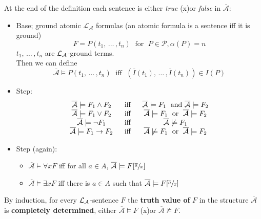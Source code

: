 At the end of the definition each sentence is either \textit{true} (x)or \textit{false} in $\overline{\mathcal{A}}$: 
\begin{itemize}
	\item Base; ground atomic $\mathcal{L}_\mathcal{A}$ formulas (an atomic formula is a sentence iff it is ground)
	$$ F = P (t_1, \, \dots \, , t_n)  \; \text{ for } \; P \in \mathcal{P}, \alpha(P) = n $$
	$t_1, \, \dots \, , t_n$ are $\mathcal{L}_\mathcal{A}$-ground terms.\\
	Then we can define
	$$
	\overline{\mathcal{A}} \models P(t_1, \, \dots \, , t_n) \; \text{ iff } \; (\overline I (t_1), \, \dots \, , \overline I (t_n)) \in I (P)
	$$
	
	\item Step: 
	$$ 
	\begin{array}{c c c}
		\overline{\mathcal{A}} \models F_1 \wedge F_2 & \; \text{ iff } \; & \overline{\mathcal{A}} \models F_1 \; \text{ and } \overline{\mathcal{A}} \models F_2 \\
		\overline{\mathcal{\mathcal{A}}} \models F_1 \vee F_2 & \; \text{ iff } \; & \overline{\mathcal{A}} \models F_1 \; \text{ or } \; \overline{\mathcal{A}} \models F_2 \\
		\overline{\mathcal{A}} \models \neg F_1 & \; \text{ iff } \; & \overline{\mathcal{A}} \not \models F_1 \\
		\overline{\mathcal{A}} \models F_1 \rightarrow F_2 & \; \text{ iff } \; & \overline{\mathcal{A}} \not \models F_1 \; \text{ or } \; \overline{\mathcal{A}} \models F_2 
	\end{array}
	$$
	
	\item Step (again): 
	\begin{itemize}[label=]
		\item $\overline{\mathcal{A}} \models \forall x F$ iff for all $a \in A$, $\overline{\mathcal{A}} \models F [\sfrac{\overline a}{x}]$
		\item $\overline{\mathcal{A}} \models \exists x F$ iff there is $a \in A$ such that $\overline{\mathcal{A}} \models F [\sfrac{\overline a}{x}]$
	\end{itemize}
	\nn
\end{itemize}

By induction, for every $\mathcal{L}_\mathcal{A}$-sentence $F$ the \textbf{truth value of} $F$ in the structure $\overline{\mathcal{A}}$ is \textbf{completely determined}, either $\overline{\mathcal{A}} \models F$ (x)or $\overline{\mathcal{A}} \not \models F$.\\

